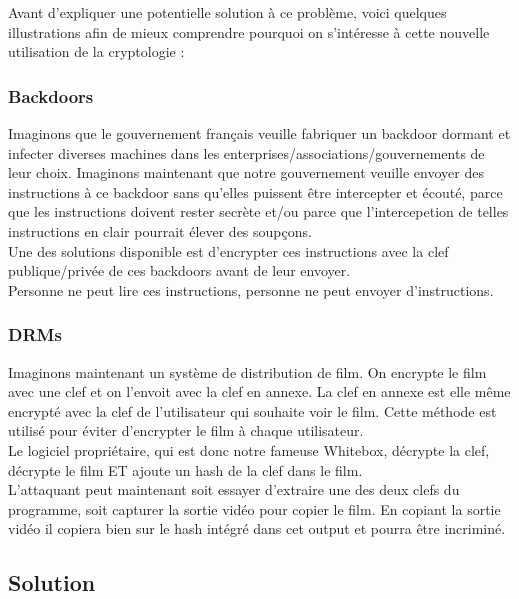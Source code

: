 \documentclass[a4paper,12pt]{article}
\begin{document}
Avant d'expliquer une potentielle solution à ce problème, voici quelques illustrations afin de mieux comprendre pourquoi on s'intéresse à cette nouvelle utilisation de la cryptologie :\\


\subsubsection{Backdoors}

Imaginons que le gouvernement français veuille fabriquer un backdoor dormant et infecter diverses machines dans les enterprises/associations/gouvernements de leur choix. Imaginons maintenant que notre gouvernement veuille envoyer des instructions à ce backdoor sans qu'elles puissent être intercepter et écouté, parce que les instructions doivent rester secrète et/ou parce que l'intercepetion de telles instructions en clair pourrait élever des soupçons.\\

Une des solutions disponible est d'encrypter ces instructions avec la clef publique/privée de ces backdoors avant de leur envoyer.\\

Personne ne peut lire ces instructions, personne ne peut envoyer d'instructions.

\subsubsection{DRMs}

Imaginons maintenant un système de distribution de film. On encrypte le film avec une clef et on l'envoit avec la clef en annexe. La clef en annexe est elle même encrypté avec la clef de l'utilisateur qui souhaite voir le film. Cette méthode est utilisé pour éviter d'encrypter le film à chaque utilisateur.\\
Le logiciel propriétaire, qui est donc notre fameuse Whitebox, décrypte la clef, décrypte le film ET ajoute un hash de la clef dans le film.\\
L'attaquant peut maintenant soit essayer d'extraire une des deux clefs du programme, soit capturer la sortie vidéo pour copier le film. En copiant la sortie vidéo il copiera bien sur le hash intégré dans cet output et pourra être incriminé.

\subsection{Solution}
\end{document}
